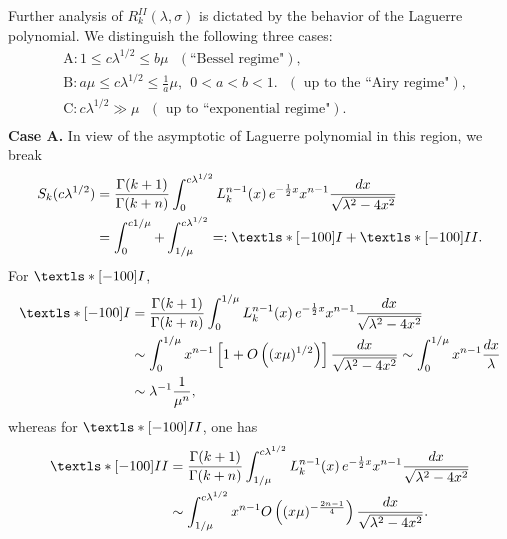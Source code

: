 \documentclass[11pt, reqno]{amsart}
\theoremstyle{plain}
\theoremstyle{remark}
\newcommand{\ROMAN}{\textls*[-100]}
\theoremstyle{example}
\theoremstyle{definition}
\numberwithin{equation}{section}
\begin{document}
Further analysis of $R_{k}^{II}(\lambda, \sigma)$ is dictated by the behavior of the Laguerre polynomial. We distinguish the following three cases:
\begin{equation*}
    \begin{split}
        & \text{A} : 1 \leq c \lambda^{1/2} \leq b \mu  \ \ \ (\text{``Bessel regime"}),\\
        & \text{B} : a \mu  \leq c \lambda^{1/2} \leq \frac{1}{a} \mu, \ \ 0<a <b<1.  \ \ \ (\text{ up to the ``Airy regime"}),\\
        & \text{C} :  c \lambda^{1/2} \gg \mu  \ \ \  (\text{ up to  ``exponential regime"}).\\
    \end{split}
\end{equation*}
\textbf{Case A.} In view of the asymptotic of Laguerre polynomial in this region, we break
\begin{equation*}\label{x var. II Coeff. Rk as Laguerre integral}
   \begin{split}
        S_{k}(c \lambda^{1/2})
        & =  \frac{\Gamma(k+1)}{\Gamma(k+n)}  \int_{0}^{c \lambda^{1/2}}  L_{k}^{n-1}(x) \, e^{-\frac{1}{2} x }  x^{n-1} \frac{dx}{\sqrt{\lambda^2 - 4 x^2}}\\
        & = \int_{0}^{c 1 / \mu} + \int_{1 / \mu}^{c \lambda^{1/2}} =: \ROMAN{I} + \ROMAN{II}.
   \end{split}
\end{equation*}
For $\ROMAN{I}$,
\begin{equation*}
   \begin{split}
        \ROMAN{I}
        & =  \frac{\Gamma(k+1)}{\Gamma(k+n)}  \int_{0}^{ 1 / \mu}  L_{k}^{n-1}(x) \, e^{-\frac{1}{2} x }  x^{n-1} \frac{dx}{\sqrt{\lambda^2 - 4 x^2}}\\
        & \sim  \int_{0}^{ 1 / \mu}   x^{n-1} \left[ 1 + O \left( (x \mu)^{1/2} \right)  \right] \frac{dx}{\sqrt{\lambda^2 - 4 x^2}} \sim  \int_{0}^{ 1 / \mu}   x^{n-1} \frac{dx}{\lambda}\\
        & \sim  \lambda^{-1} \frac{1}{\mu^{n}},
   \end{split}
\end{equation*}
whereas for $\ROMAN{ II }$, one has
\begin{equation*}
   \begin{split}
        \ROMAN{ II }
        & =  \frac{\Gamma(k+1)}{\Gamma(k+n)}  \int_{1 / \mu}^{c \lambda^{1/2}}  L_{k}^{n-1}(x) \, e^{-\frac{1}{2} x }  x^{n-1} \frac{dx}{\sqrt{\lambda^2 - 4 x^2}}\\
        & \sim  \int_{ 1 / \mu}^{c \lambda^{1/2}}   x^{n-1} O \left(  (x \mu )^{-\frac{2n-1}{4}} \right) \frac{dx}{\sqrt{\lambda^2 - 4 x^2}}.
   \end{split}
\end{equation*}
\end{document}
